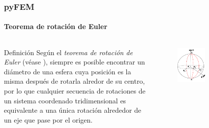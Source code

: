 \documentclass{beamer}
\begin{document}
\begin{frame}
  \frametitle{pyFEM}
  \framesubtitle{Teorema de rotación de Euler}
  \begin{columns}
    \begin{block}{Definición}
      Según el \emph{teorema de rotación de Euler} (véase \cite{euler_rotations}), siempre es posible encontrar un diámetro de una esfera cuya posición es la misma después de rotarla alredor de su centro, por lo que cualquier secuencia de rotaciones de un sistema coordenado tridimensional es equivalente a una única rotación alrededor de un eje que pase por el origen.\\
    \end{block}

    \begin{figure}
      \includegraphics[width=0.5\textwidth]{euler_rotation.png}
    \end{figure}
  \end{columns}      
\end{frame}
\end{document}
